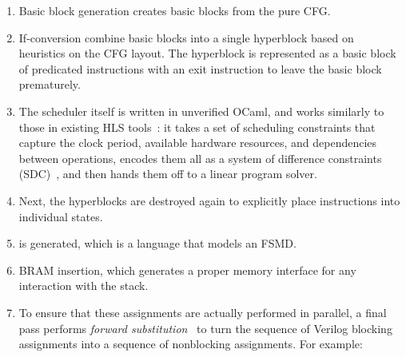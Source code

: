 \begin{enumerate}[label=\protect\blacknum{\arabic*}]
\item Basic block generation creates basic blocks from the pure \rtl{}
  \gls{CFG}.
\item If-conversion combine basic blocks into a single hyperblock based on
  heuristics on the \gls{CFG} layout.  The hyperblock is represented as a basic
  block of predicated instructions with an exit instruction to leave the basic
  block prematurely.
\item The scheduler itself is written in unverified OCaml, and works similarly
  to those in existing HLS tools~\cite[]{canis13_l}: it takes a set of
  scheduling constraints that capture the clock period, available hardware
  resources, and dependencies between operations, encodes them all as a system
  of difference constraints (SDC)~\cite[]{cong06_sdc}, and then hands them off
  to a linear program solver.
\item Next, the hyperblocks are destroyed again to explicitly place instructions
  into individual states.
\item \htl{} is generated, which is a language that models an \gls{FSMD}.
\item \gls{BRAM} insertion, which generates a proper memory interface for any
  interaction with the stack.
\item To ensure that these assignments are actually performed in parallel, a
  final pass performs \emph{forward substitution}~\cite[p.~109]{hopwood78_decom}
  to turn the sequence of Verilog blocking assignments into a sequence of
  nonblocking assignments. For example:
%
\begin{center}
\end{center}
\end{enumerate}
